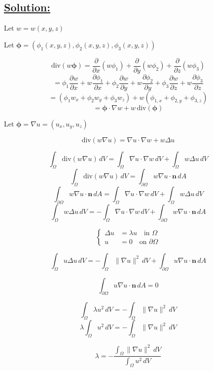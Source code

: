 \documentclass{article}
\begin{document}
\subsection*{\underline{Solution:}}

Let $w = w(x,y,z)$

Let $\boldsymbol{\phi} = (\phi_1(x,y,z), \phi_2(x,y,z), \phi_3(x,y,z))$

\[
\text{div}(w\boldsymbol{\phi}) = \frac{\partial}{\partial x}(w \phi_1) + \frac{\partial}{\partial y}(w \phi_2) + \frac{\partial}{\partial z}(w \phi_3)
\]
\[
= \phi_1 \frac{\partial w}{\partial x} + w \frac{\partial \phi_1}{\partial x}
+ \phi_2 \frac{\partial w}{\partial y} + w \frac{\partial \phi_2}{\partial y}
+ \phi_3 \frac{\partial w}{\partial z} + w \frac{\partial \phi_3}{\partial z}
\]
\[
= (\phi_1 w_x + \phi_2 w_y + \phi_3 w_z) + w(\phi_{1,x} + \phi_{2,y} + \phi_{3,z})
\]
\[
= \boldsymbol{\phi} \cdot \nabla w + w \, \text{div}(\boldsymbol{\phi})
\]

Let $\boldsymbol{\phi} = \nabla u = (u_x, u_y, u_z)$

\[
\text{div}(w \nabla u) = \nabla u \cdot \nabla w + w \Delta u
\]

\[
\int_\Omega \text{div}(w \nabla u) \, dV = \int_\Omega \nabla u \cdot \nabla w \, dV + \int_\Omega w \Delta u \, dV
\]
\[
\int_\Omega \text{div}(w \nabla u) \, dV = \int_{\partial \Omega} w \nabla u \cdot \mathbf{n} \, dA
\]
\[
\int_{\partial \Omega} w \nabla u \cdot \mathbf{n} \, dA = \int_\Omega \nabla u \cdot \nabla w \, dV + \int_\Omega w \Delta u \, dV
\]
\[
\int_\Omega w \Delta u \, dV = -\int_\Omega \nabla u \cdot \nabla w \, dV + \int_{\partial \Omega} w \nabla u \cdot \mathbf{n} \, dA
\]

\[
\left\{
\begin{aligned}
\Delta u &= \lambda u \quad \text{in } \Omega \\
u &= 0 \quad \text{on } \partial \Omega
\end{aligned}
\right.
\]

\[
\int_\Omega u \Delta u \, dV = - \int_\Omega \|\nabla u\|^2 \, dV + \int_{\partial \Omega} u \nabla u \cdot \mathbf{n} \, dA
\]

\[
\int_{\partial \Omega} u \nabla u \cdot \mathbf{n} \, dA = 0
\]

\[
\int_\Omega \lambda u^2 \, dV = - \int_\Omega \|\nabla u\|^2 \, dV
\]
\[
\lambda \int_\Omega u^2 \, dV = - \int_\Omega \|\nabla u\|^2 \, dV
\]

\[
\lambda = - \frac{ \int_\Omega \|\nabla u\|^2 \, dV }{ \int_\Omega u^2 \, dV }
\]
\end{document}
